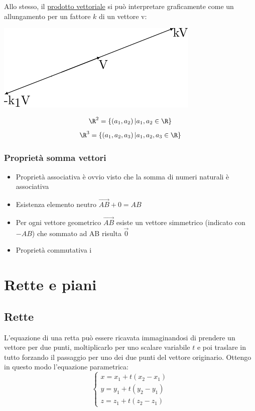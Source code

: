 \documentclass[12pt,a4paper,oneside]{article}
\begin{document}
Allo stesso, il \underline{prodotto vettoriale} si può interpretare graficamente come un allungamento per un fattore $k$ di un vettore v:

\begin{center}
	\includegraphics{Images/Prodotto per scalare.pdf}
\end{center}

\[
	\R^2 = \left\{ \left( a_1, a_2 \right) | a_1,a_{2}  \in \R \right\}
\]
\[
	\R^{3} = \left\{ \left( a_1,a_2,a_3 \right) | a_1,a_2,a_3  \in \R \right\}
\]

\subsubsection*{Proprietà somma vettori}
\label{sub:proprietàsommavettori}
\begin{itemize}
	\item Proprietà associativa \rarr è ovvio visto che la somma di numeri naturali è associativa
	\item Esistenza elemento neutro $\vec{AB} + 0 = AB$
	\item Per ogni vettore geometrico $\vec{{AB}}$ esiste un vettore simmetrico (indicato con $-AB$) che sommato ad AB risulta $\vec{0}$
	\item Proprietà commutativa
	      i
\end{itemize}

\section{Rette e piani}
\subsection{Rette}
L'equazione di una retta può essere ricavata immaginandosi di prendere un vettore per due punti, moltiplicarlo per uno scalare variabile  $t$ e poi traslare in tutto forzando il passaggio per uno dei due punti del vettore originario. Ottengo in questo modo l'equazione parametrica:
\[
	\begin{cases}
		x = x_1 + t\left( x_2-x_1 \right) \\
		y = y_1 + t\left( y_2-y_1 \right) \\
		z = z_1 + t\left( z_2-z_1 \right)
	\end{cases}
\]
\end{document}
